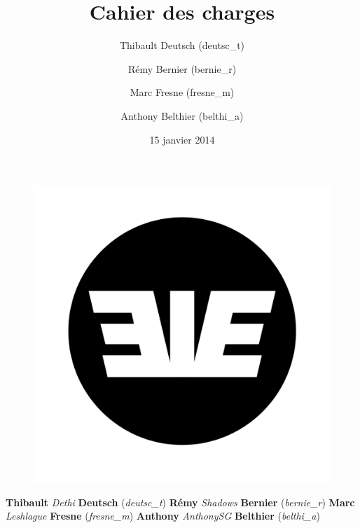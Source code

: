 \documentclass[a4paper, 11pt]{report}
\title{Cahier des charges}
\author{Thibault Deutsch (deutsc\_t) \and Rémy Bernier (bernie\_r) \and Marc Fresne (fresne\_m) \and Anthony Belthier (belthi\_a)}
\date{15 janvier 2014}
\begin{document}

\thispagestyle{empty}
\begin{center}
{}
\par
\vspace*{0.5cm}
{}
\par
{\fontsize{15}{18}{{\textbf{\today}}}}
\end{center}

\vspace*{0.5cm}
\begin{figure}[htbp]
   \begin{center}
      \includegraphics[scale = 0.05]{eie.png}
   \end{center}
\end{figure}

\vspace*{0.5cm}
\par
\begin{center}
\fontsize{16}{20}
\textbf{Thibault }
\emph{Dethi }
\textbf{Deutsch}
(\emph{deutsc\_t})
\newline
\textbf{Rémy }
\emph{Shadows }
\textbf{Bernier}
(\emph{bernie\_r})
\newline
\textbf{Marc }
\emph{Leshlague }
\textbf{Fresne}
(\emph{fresne\_m})
\newline
\textbf{Anthony }
\emph{AnthonySG }
\textbf{Belthier}
(\emph{belthi\_a})
\newline
\end{center}
\end{document}
